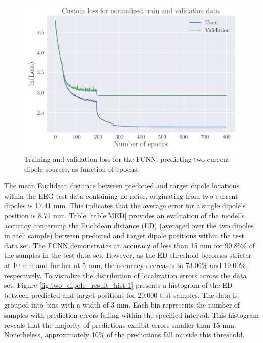 \documentclass[a4paper, UKenglish, 11pt]{uiomaster}
\begin{document}
\begin{figure}[!htb]
    \centering
    \includegraphics[width=\linewidth]{figures/NN_two_dipole/Custom_Loss_simple_last_run_old_std_2_dipoles_32_0.001_0.35_0.1_0_800_(0).pdf}
    \caption{Training and validation loss for the FCNN, predicting two current dipole sources, as function of epochs.}
    \label{fig:two_dipole_result_FCNN}
\end{figure}

\FloatBarrier

The mean Euclidean distance between predicted and target dipole locations within the EEG test data containing no noise, originating from two current dipoles is 17.41 mm. This indicates that the average error for a single dipole's position is 8.71 mm. Table \ref{table:MED} provides an evaluation of the model's accuracy concerning the Euclidean distance (ED) (averaged over the two dipoles in each sample) between predicted and target dipole positions within the test data set. The FCNN demonstrates an accuracy of less than 15 mm for 90.85$\%$ of the samples in the test data set. However, as the ED threshold becomes stricter at 10 mm and further at 5 mm, the accuracy decreases to 73.06$\%$ and 19.00$\%$, respectively. To visualize the distribution of localization errors across the data set, Figure \ref{fig:two_dipole_result_hist-1} presents a histogram of the ED between predicted and target positions for 20,000 test samples. The data is grouped into bins with a width of 3 mm. Each bin represents the number of samples with prediction errors falling within the specified interval. This histogram reveals that the majority of predictions exhibit errors smaller than 15 mm. Nonetheless, approximately 10$\%$ of the predictions fall outside this threshold.
\end{document}
